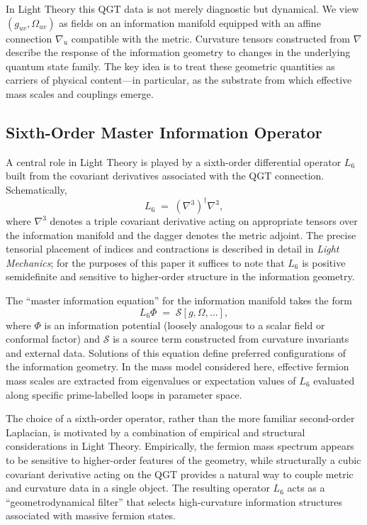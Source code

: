 \documentclass[12pt]{article}
\begin{document}
In Light Theory this QGT data is not merely diagnostic but dynamical.
We view $(g_{uv},\Omega_{uv})$ as fields on an information manifold equipped
with an affine connection $\nabla_u$ compatible with the metric.  Curvature
tensors constructed from $\nabla$ describe the response of the information
geometry to changes in the underlying quantum state family.  The key idea is to
treat these geometric quantities as carriers of physical content---in
particular, as the substrate from which effective mass scales and couplings
emerge.

\subsection{Sixth-Order Master Information Operator}

A central role in Light Theory is played by a sixth-order differential
operator $L_6$ built from the covariant derivatives associated with the QGT
connection.  Schematically,
\begin{equation}
  L_6 \;=\; (\nabla^3)^\dagger \nabla^3,
\end{equation}
where $\nabla^3$ denotes a triple covariant derivative acting on appropriate
tensors over the information manifold and the dagger denotes the metric
adjoint.  The precise tensorial placement of indices and contractions is
described in detail in \emph{Light Mechanics}; for the purposes of this paper
it suffices to note that $L_6$ is positive semidefinite and sensitive to
higher-order structure in the information geometry.

The ``master information equation'' for the information manifold takes the form
\begin{equation}
  L_6 \Phi \;=\; \mathcal{S}[g,\Omega,\ldots],
\end{equation}
where $\Phi$ is an information potential (loosely analogous to a scalar field
or conformal factor) and $\mathcal{S}$ is a source term constructed from
curvature invariants and external data.  Solutions of this equation define
preferred configurations of the information geometry.  In the mass model
considered here, effective fermion mass scales are extracted from eigenvalues
or expectation values of $L_6$ evaluated along specific prime-labelled loops in
parameter space.

The choice of a sixth-order operator, rather than the more familiar
second-order Laplacian, is motivated by a combination of empirical and
structural considerations in Light Theory.  Empirically, the fermion mass
spectrum appears to be sensitive to higher-order features of the geometry,
while structurally a cubic covariant derivative acting on the QGT provides a
natural way to couple metric and curvature data in a single object.  The
resulting operator $L_6$ acts as a ``geometrodynamical filter'' that selects
high-curvature information structures associated with massive fermion states.
\end{document}
